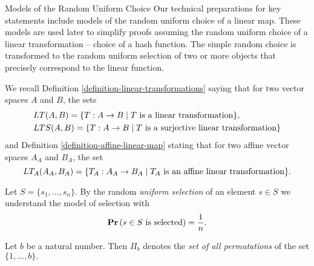 \begin{section}{Models of the Random Uniform Choice}
Our technical preparations for key statements include models of the random uniform choice of a linear map. These models are used later to simplify proofs assuming the random uniform choice of a linear transformation -- choice of a hash function. The simple random choice is transformed to the random uniform selection of two or more objects that precisely correspond to the linear function.

We recall Definition \ref{definition-linear-transformations} saying that for two vector spaces $A$ and $B$, the sets 
\[
\begin{split}
& LT(A, B) = \{ T: A \rightarrow B \mid T \text{ is a linear transformation} \} \text{,} \\
& LTS(A, B) = \{ T: A \rightarrow B \mid T \text{ is a surjective linear transformation} \}
\end{split}
\]
and Definition \ref{definition-affine-linear-map} stating that for two affine vector spaces $A_A$ and $B_A$, the set
\[
LT_A(A_A, B_A) = \{ T_A: A_A \rightarrow B_A \mid T_A \text{ is an affine linear transformation} \} \text{.}
\]

\begin{definition}
Let $S = \{ s_1, \dots, s_n \}$. By the random \emph{uniform selection} of an element $s \in S$ we understand the model of selection with
\[
	\mathbf{Pr}\left(s \in S \text{ is selected}\right) = \frac{1}{n} \text{.}
\]
\end{definition}

\begin{definition}
Let $b$ be a natural number. Then $\Pi_b$ denotes the \emph{set of all permutations} of the set $\{1, \dots, b\}.$
\end{definition}


\end{section}
